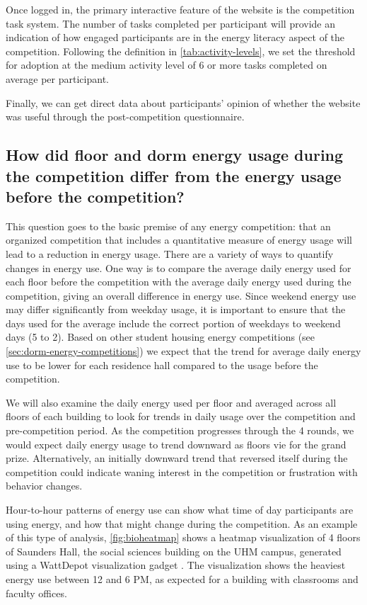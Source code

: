 Once logged in, the primary interactive feature of the website is the competition task system. The number of tasks completed per participant will provide an indication of how engaged participants are in the energy literacy aspect of the competition. Following the definition in \autoref{tab:activity-levels}, we set the threshold for adoption at the medium activity level of 6 or more tasks completed on average per participant.

Finally, we can get direct data about participants' opinion of whether the website was useful through the post-competition questionnaire.

\subsection[How did energy use change during the competition?]{How did floor and dorm energy usage during the competition differ from the energy usage before the competition?}
\label{sec:competition-energy}

This question goes to the basic premise of any energy competition: that an organized competition that includes a quantitative measure of energy usage will lead to a reduction in energy usage. There are a variety of ways to quantify changes in energy use. One way is to compare the average daily energy used for each floor before the competition with the average daily energy used during the competition, giving an overall difference in energy use. Since weekend energy use may differ significantly from weekday usage, it is important to ensure that the days used for the average include the correct portion of weekdays to weekend days (5 to 2). Based on other student housing energy competitions (see \autoref{sec:dorm-energy-competitions}) we expect that the trend for average daily energy use to be lower for each residence hall compared to the usage before the competition.

We will also examine the daily energy used per floor and averaged across all floors of each building to look for trends in daily usage over the competition and pre-competition period. As the competition progresses through the 4 rounds, we would expect daily energy usage to trend downward as floors vie for the grand prize. Alternatively, an initially downward trend that reversed itself during the competition could indicate waning interest in the competition or frustration with behavior changes.

Hour-to-hour patterns of energy use can show what time of day participants are using energy, and how that might change during the competition. As an example of this type of analysis, \autoref{fig:bioheatmap} shows a heatmap visualization of 4 floors of Saunders Hall, the social sciences building on the UHM campus, generated using a WattDepot visualization gadget \cite{WattDepotGadgets}. The visualization shows the heaviest energy use between 12 and 6 PM, as expected for a building with classrooms and faculty offices.

